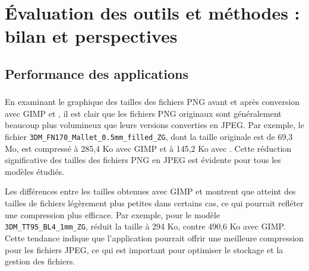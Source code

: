 \part{Évaluation des outils et méthodes : bilan et perspectives}
\chapter{Performance des applications}
    \section{\cvt}   
    En examinant le graphique des tailles des fichiers PNG avant et après conversion avec GIMP et \py, il est clair que les fichiers PNG originaux sont généralement beaucoup plus volumineux que leurs versions converties en JPEG. Par exemple, le fichier \texttt{3DM\_FN170\_Mallet\_0.5mm\_filled\_ZG}, dont la taille originale est de 69,3 Mo, est compressé à 285,4 Ko avec GIMP et à 145,2 Ko avec \py. Cette réduction significative des tailles des fichiers PNG en JPEG est évidente pour tous les modèles étudiés. 
    
    Les différences entre les tailles obtenues avec GIMP et \py montrent que \py atteint des tailles de fichiers légèrement plus petites dans certains cas, ce qui pourrait refléter une compression plus efficace. Par exemple, pour le modèle \texttt{3DM\_TT95\_BL4\_1mm\_ZG}, \py réduit la taille à 294 Ko, contre 490,6 Ko avec GIMP. Cette tendance indique que l'application \py \cvt pourrait offrir une meilleure compression pour les fichiers JPEG, ce qui est important pour optimiser le stockage et la gestion des fichiers.

        \begin{table}[htbp]
            \centering
                \caption{Comparaison des tailles de fichiers avant et après conversion (GIMP et \cvt)}
        \end{table}

